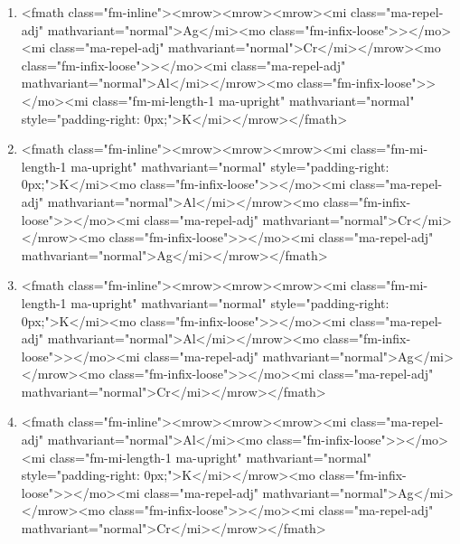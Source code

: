 \documentclass{article}
\begin{document}
\begin{enumerate}[label=(\alph*)]
\item  <fmath class="fm-inline"><mrow><mrow><mrow><mi class="ma-repel-adj" mathvariant="normal">Ag</mi><mo class="fm-infix-loose">></mo><mi class="ma-repel-adj" mathvariant="normal">Cr</mi></mrow><mo class="fm-infix-loose">></mo><mi class="ma-repel-adj" mathvariant="normal">Al</mi></mrow><mo class="fm-infix-loose">></mo><mi class="fm-mi-length-1 ma-upright" mathvariant="normal" style="padding-right: 0px;">K</mi></mrow></fmath>
\item  <fmath class="fm-inline"><mrow><mrow><mrow><mi class="fm-mi-length-1 ma-upright" mathvariant="normal" style="padding-right: 0px;">K</mi><mo class="fm-infix-loose">></mo><mi class="ma-repel-adj" mathvariant="normal">Al</mi></mrow><mo class="fm-infix-loose">></mo><mi class="ma-repel-adj" mathvariant="normal">Cr</mi></mrow><mo class="fm-infix-loose">></mo><mi class="ma-repel-adj" mathvariant="normal">Ag</mi></mrow></fmath>
\item  <fmath class="fm-inline"><mrow><mrow><mrow><mi class="fm-mi-length-1 ma-upright" mathvariant="normal" style="padding-right: 0px;">K</mi><mo class="fm-infix-loose">></mo><mi class="ma-repel-adj" mathvariant="normal">Al</mi></mrow><mo class="fm-infix-loose">></mo><mi class="ma-repel-adj" mathvariant="normal">Ag</mi></mrow><mo class="fm-infix-loose">></mo><mi class="ma-repel-adj" mathvariant="normal">Cr</mi></mrow></fmath>
\item  <fmath class="fm-inline"><mrow><mrow><mrow><mi class="ma-repel-adj" mathvariant="normal">Al</mi><mo class="fm-infix-loose">></mo><mi class="fm-mi-length-1 ma-upright" mathvariant="normal" style="padding-right: 0px;">K</mi></mrow><mo class="fm-infix-loose">></mo><mi class="ma-repel-adj" mathvariant="normal">Ag</mi></mrow><mo class="fm-infix-loose">></mo><mi class="ma-repel-adj" mathvariant="normal">Cr</mi></mrow></fmath>
\end{enumerate}
\newpage
\end{document}
